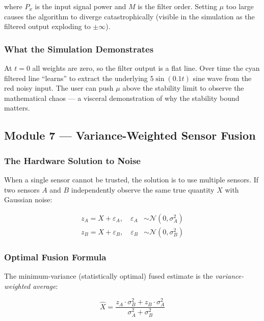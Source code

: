 \documentclass[12pt, a4paper]{article}
\begin{document}
where $P_x$ is the input signal power and $M$ is the filter order. Setting $\mu$ too
large causes the algorithm to diverge catastrophically (visible in the simulation as
the filtered output exploding to $\pm\infty$).

\subsubsection{What the Simulation Demonstrates}

At $t = 0$ all weights are zero, so the filter output is a flat line. Over time the
cyan filtered line ``learns'' to extract the underlying $5\sin(0.1t)$ sine wave from
the red noisy input. The user can push $\mu$ above the stability limit to observe the
mathematical chaos --- a visceral demonstration of why the stability bound matters.

\subsection{Module 7 --- Variance-Weighted Sensor Fusion}

\subsubsection{The Hardware Solution to Noise}

When a single sensor cannot be trusted, the solution is to use multiple sensors. If
two sensors $A$ and $B$ independently observe the same true quantity $X$ with
Gaussian noise:

\begin{align}
  z_A = X + \varepsilon_A, \quad \varepsilon_A &\sim \mathcal{N}(0, \sigma_A^2) \\
  z_B = X + \varepsilon_B, \quad \varepsilon_B &\sim \mathcal{N}(0, \sigma_B^2)
\end{align}

\subsubsection{Optimal Fusion Formula}

The minimum-variance (statistically optimal) fused estimate is the
\emph{variance-weighted average}:

\begin{equation}
  \hat{X} = \frac{z_A \cdot \sigma_B^2 + z_B \cdot \sigma_A^2}{\sigma_A^2 + \sigma_B^2}
  \label{eq:fusion}
\end{equation}
\end{document}
